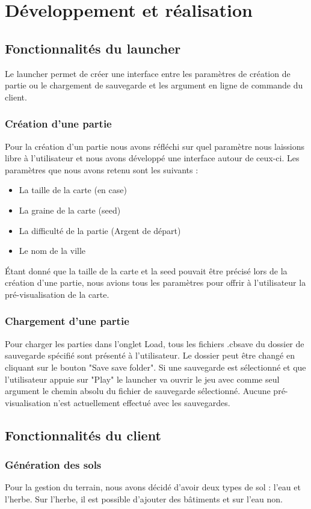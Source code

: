 \documentclass[a4paper,10pt,openany,oneside]{report}
\begin{document}
\chapter{Développement et réalisation}
\thispagestyle{headings}
\section{Fonctionnalités du launcher}
Le launcher permet de créer une interface entre les paramètres de création de partie ou le chargement de sauvegarde et les argument en ligne de commande du client.
\subsection{Création d'une partie}
Pour la création d'un partie nous avons réfléchi sur quel paramètre nous laissions libre à l'utilisateur et nous avons développé une interface autour de ceux-ci.
\newline
Les paramètres que nous avons retenu sont les suivants :
\begin{itemize}
	\item La taille de la carte (en case)
	\item La graine de la carte (seed)
	\item La difficulté de la partie (Argent de départ)
	\item Le nom de la ville
\end{itemize}
Étant donné que la taille de la carte et la seed pouvait être précisé lors de la création d'une partie, nous avions tous les paramètres pour offrir à l'utilisateur la pré-visualisation de la carte.
\subsection{Chargement d'une partie}
Pour charger les parties dans l'onglet Load, tous les fichiers .cbsave du dossier de sauvegarde spécifié sont présenté à l'utilisateur. Le dossier peut être changé en cliquant sur le bouton "Save save folder".
Si une sauvegarde est sélectionné et que l'utilisateur appuie sur "Play" le launcher va ouvrir le jeu avec comme seul argument le chemin absolu du fichier de sauvegarde sélectionné. Aucune pré-visualisation n'est actuellement effectué avec les sauvegardes.
\section{Fonctionnalités du client}
\subsection{Génération des sols}
Pour la gestion du terrain, nous avons décidé d'avoir deux types de sol : l'eau et l'herbe. Sur l'herbe, il est possible d'ajouter des bâtiments et sur l'eau non.
\end{document}
